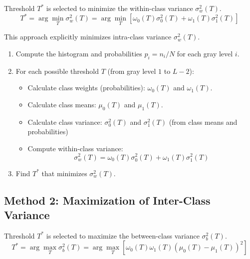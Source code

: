 Threshold $T^*$ is selected to minimize the within-class variance $\sigma_w^2(T)$.
$$
  T^* = \arg\min_T \sigma_w^2(T) = \arg\min_T \left[ \omega_0(T) \sigma_0^2(T) + \omega_1(T) \sigma_1^2(T) \right]
$$

\noindent This approach explicitly minimizes intra-class variance $\sigma_w^2(T)$.

\begin{enumerate}
    \item Compute the histogram and probabilities $p_i = n_i/N$ for each gray level $i$.
    \item For each possible threshold $T$ (from gray level $1$ to $L-2$): \begin{itemize}
        \item Calculate class weights (probabilities): $\omega_0(T)$ and $\omega_1(T)$.
        \item Calculate class means: $\mu_0(T)$ and $\mu_1(T)$.
        \item Calculate class variance: $\sigma_0^2(T)$ and $\sigma_1^2(T)$ (from class means and probabilities)
        \item Compute within-class variance:
            \[
            \sigma_w^2(T) = \omega_0(T) \sigma_0^2(T) + \omega_1(T) \sigma_1^2(T)
            \]
    \end{itemize}
    \item Find $T^*$ that minimizes $\sigma_w^2(T)$.
\end{enumerate}




\subsection{Method 2: Maximization of Inter-Class Variance}

Threshold $T^*$ is selected to maximize the between-class variance $\sigma_b^2(T)$.
$$
  T^* = \arg\max_T \sigma_b^2(T) = \arg\max_T \left[ \omega_0(T) \omega_1(T) \left( \mu_0(T) - \mu_1(T) \right)^2 \right]
$$

